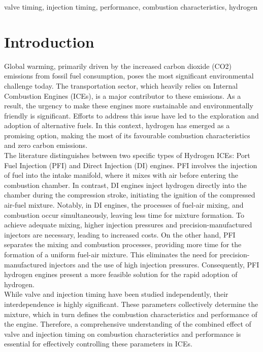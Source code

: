 \documentclass[conference]{IEEEtran}
\begin{document}
\begin{IEEEkeywords}
valve timing, injection timing, performance, combustion characteristics, hydrogen
\end{IEEEkeywords}

\section{Introduction}

Global warming, primarily driven by the increased carbon dioxide (CO2) emissions from fossil fuel consumption, poses the most significant environmental challenge today. The transportation sector, which heavily relies on Internal Combustion Engines (ICEs), is a major contributor to these emissions. As a result, the urgency to make these engines more sustainable and environmentally friendly is significant. Efforts to address this issue have led to the exploration and adoption of alternative fuels. In this context, hydrogen has emerged as a promising option, making the most of its favourable combustion characteristics and zero carbon emissions.\\

The literature distinguishes between two specific types of Hydrogen ICEs: Port Fuel Injection (PFI) and Direct Injection (DI) engines. PFI involves the injection of fuel into the intake manifold, where it mixes with air before entering the combustion chamber. In contrast, DI engines inject hydrogen directly into the chamber during the compression stroke, initiating the ignition of the compressed air-fuel mixture. Notably, in DI engines, the processes of fuel-air mixing, and combustion occur simultaneously, leaving less time for mixture formation. To achieve adequate mixing, higher injection pressures and precision-manufactured injectors are necessary, leading to increased costs. On the other hand, PFI separates the mixing and combustion processes, providing more time for the formation of a uniform fuel-air mixture. This eliminates the need for precision-manufactured injectors and the use of high injection pressures. Consequently, PFI hydrogen engines present a more feasible solution for the rapid adoption of hydrogen.\\

While valve and injection timing have been studied independently, their interdependence is highly significant. These parameters collectively determine the mixture, which in turn defines the combustion characteristics and performance of the engine. Therefore, a comprehensive understanding of the combined effect of valve and injection timing on combustion characteristics and performance is essential for effectively controlling these parameters in ICEs.
\end{document}

